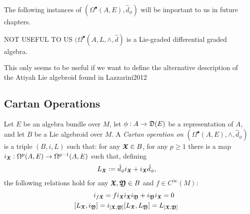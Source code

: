 \linea 

{\color{gray}
The following instances of $(\Omega^\bullet(A, E), \hat d_\phi)$ will be important to us in future chapters.

\begin{theorem}
 NOT USEFUL TO US
$(\Omega^\bullet(A, L, \wedge, \hat d)$ is a Lie-graded differential graded algebra.
\end{theorem}
}

{\color{gray} This only seems to be useful if we want to define the alternative description of the Atiyah Lie algebroid found in Lazzarini2012

\subsection{Cartan Operations}





\begin{definition}
Let $E$ be an algebra bundle over $M$, let $\phi: A \to \alg D(E)$ be a representation of $A$, and let $B$ be a Lie algebroid over $M$. A \emph{Cartan operation on $(\Omega^\bullet(A, E), \wedge, \hat d_\phi)$} is a triple $(B, i, L)$ such that: for any $\bm{\mathfrak{X}} \in B$, for any $p \geq 1$ there is a map $i_{\bm{\mathfrak{X}}}: \Omega^p(A, E) \to \Omega^{p-1}(A, E)$ such that, defining 
\begin{align}
L_{\sectoid X} := \hat d_\phi i_{\sectoid X} + i_{\sectoid X}\hat d_\phi,
\end{align}
the following relations hold for any $\bm{\mathfrak{X}}, \bm{\mathfrak{Y}} \in B$ and $f \in C^\infty(M)$:
\begin{align}
    i_{f \sectoid X} = f i_{\sectoid X} & i_{\sectoid X} i_{\sectoid Y} + i_{\sectoid Y} i_{\sectoid X} = 0 \\
    [L_{\sectoid X}, i_{\sectoid Y}] = i_{[\sectoid X, \sectoid Y]} & [L_{\sectoid X}, L_{\sectoid Y}] = L_{[\sectoid X, \sectoid Y]}
\end{align}
\end{definition}

}
